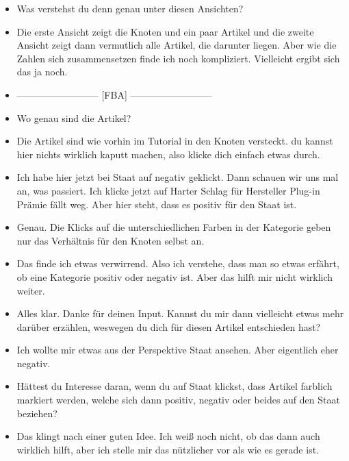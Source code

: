 {\begin{itemize}[]
            \item {} Was verstehst du denn genau unter diesen Ansichten?
            \item {} Die erste Ansicht zeigt die Knoten und ein paar Artikel und die zweite Ansicht zeigt dann vermutlich alle Artikel, die darunter liegen.
                  Aber wie die Zahlen sich zusammensetzen finde ich noch kompliziert.
                  Vielleicht ergibt sich das ja noch.
            \item {--------------------------} [FBA] {--------------------------}
            \item {} Wo genau sind die Artikel?
            \item {} Die Artikel sind wie vorhin im Tutorial in den Knoten versteckt.
                  du kannst hier nichts wirklich kaputt machen, also klicke dich einfach etwas durch.
            \item {} Ich habe hier jetzt bei Staat auf negativ geklickt.
                  Dann schauen wir uns mal an, was passiert.
                  Ich klicke jetzt auf \flqq Harter Schlag für Hersteller Plug-in Prämie fällt weg\frqq{}.
                  Aber hier steht, dass es positiv für den Staat ist.
            \item {} Genau.
                  Die Klicks auf die unterschiedlichen Farben in der Kategorie geben nur das Verhältnis für den Knoten selbst an.
            \item {} Das finde ich etwas verwirrend.
                  Also ich verstehe, dass man so etwas erfährt, ob eine Kategorie positiv oder negativ ist.
                  Aber das hilft mir nicht wirklich weiter.
            \item {} Alles klar.
                  Danke für deinen Input.
                  Kannst du mir dann vielleicht etwas mehr darüber erzählen, weswegen du dich für diesen Artikel entschieden hast?
            \item {} Ich wollte mir etwas aus der Perspektive Staat ansehen. Aber eigentlich eher negativ.
            \item {} Hättest du Interesse daran, wenn du auf Staat klickst, dass Artikel farblich markiert werden, welche sich dann positiv, negativ oder beides auf den Staat beziehen?
            \item {} Das klingt nach einer guten Idee.
                  Ich weiß noch nicht, ob das dann auch wirklich hilft, aber ich stelle mir das nützlicher vor als wie es gerade ist.

\end{itemize}}
